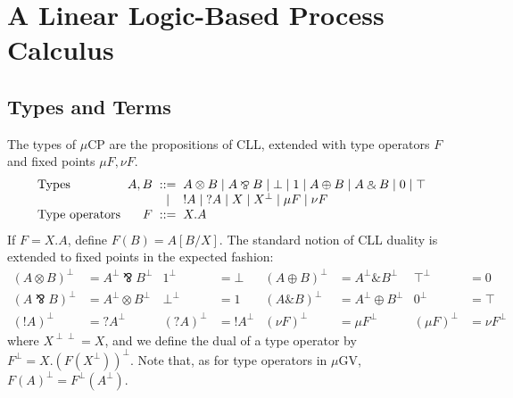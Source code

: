 \documentclass[orivec,envcountsame]{llncs}
\newcommand{\with}{\mathbin\binampersand}
\newcommand{\parr}{\mathbin\bindnasrepma}
\newcommand{\cpdual}[1]{#1^\perp}
\newcommand{\cpbang}[1]{{! #1}}
\newcommand{\cpquery}[1]{{? #1}}
\newcommand{\mucp}{$\mu\mathrm{CP}$\xspace}
\newcommand{\mugv}{$\mu\mathrm{GV}$\xspace}
\begin{document}
\section{A Linear Logic-Based Process Calculus}\label{sec:mucp}

\subsection{Types and Terms}

The types of \mucp are the propositions of CLL, extended with type operators $F$ and fixed points
$\mu F,\nu F$.
\[\begin{array}{l@{\hspace{2mm}}r@{\hspace{2mm}}c@{\hspace{2mm}}l}
  \text{Types} & A,B & ::= & A \otimes B \mid A \parr B \mid \bot \mid 1 \mid A \oplus B \mid A \with B \mid 0 \mid \top \\
   & & \mid & \cpbang{A} \mid \cpquery{A} \mid X \mid \cpdual{X} \mid \mu F \mid \nu F \\
   \text{Type operators} & F & ::= & X.A %
\end{array}\]
If $F = X.A$, define $F(B) = A[B/X]$.  The standard notion of CLL duality is extended to fixed
points in the expected fashion:
\begin{align*}
  \cpdual{(A \otimes B)} &= \cpdual{A} \parr \cpdual{B} & \cpdual{1} &= \bot &
    \cpdual{(A \oplus B)} &= \cpdual{A} \with \cpdual{B} & \cpdual{\top} &= 0 \\
  \cpdual{(A \parr B)} &= \cpdual{A} \otimes \cpdual{B} & \cpdual{\bot} &= 1 &
    \cpdual{(A \with B)} &= \cpdual{A} \oplus \cpdual{B} & \cpdual{0} &= \top \\
  \cpdual{(\cpbang{A})} &= \cpquery{\cpdual{A}} & \cpdual{(\cpquery{A})} &= \cpbang{\cpdual{A}} &
     \cpdual{(\nu F)} &= \mu \cpdual{F} & \cpdual{(\mu F)} &= \nu \cpdual{F}
\end{align*}
where $X^{\perp\perp}  = X$, and we define the dual of a type operator by $\cpdual{F} =
X.\cpdual{(F(\cpdual{X}))}.$ Note that, as for type operators in \mugv, $\cpdual{F(A)} =
\cpdual{F}(\cpdual{A})$.
\end{document}
